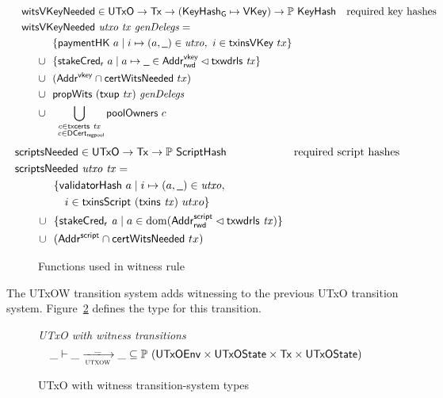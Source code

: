 \begin{figure}[htb]
  \begin{align*}
    & \hspace{-0.8cm}\fun{witsVKeyNeeded} \in \UTxO \to \Tx \to (\KeyHashGen\mapsto\VKey) \to
      \powerset{\KeyHash}
    & \text{required key hashes} \\
    &  \hspace{-0.8cm}\fun{witsVKeyNeeded}~\var{utxo}~\var{tx}~\var{genDelegs} = \\
    & ~~\{ \fun{paymentHK}~a \mid i \mapsto (a, \wcard) \in \var{utxo},~i\in\fun{txinsVKey}~{tx} \} \\
    \cup & ~~
           \{\fun{stakeCred_r}~a\mid a\mapsto \wcard \in \AddrRWDVKey
      \restrictdom \txwdrls{tx}\}\\
    \cup & ~~(\AddrVKey \cap \fun{certWitsNeeded}~{tx}) \\
    \cup & ~~\fun{propWits}~(\fun{txup}~\var{tx})~\var{genDelegs} \\
    \cup & ~~\bigcup_{\substack{c \in \txcerts{tx} \\ ~c \in\DCertRegPool}} \fun{poolOwners}~{c}
  \end{align*}
  \begin{align*}
    & \hspace{-1cm}\fun{scriptsNeeded} \in \UTxO \to \Tx \to
      \powerset{\HashScr}
    & \text{required script hashes} \\
    &  \hspace{-1cm}\fun{scriptsNeeded}~\var{utxo}~\var{tx} = \\
    & ~~\{ \fun{validatorHash}~a \mid i \mapsto (a, \wcard) \in \var{utxo},\\
    & ~~~~~i\in\fun{txinsScript}~{(\fun{txins~\var{tx}})}~{utxo}\} \\
    \cup & ~~\{ \fun{stakeCred_{r}}~\var{a} \mid a \in \dom (\AddrRWDScr
           \restrictdom \fun{txwdrls}~\var{tx}) \} \\
      \cup & ~~(\AddrScr \cap \fun{certWitsNeeded}~{tx})
  \end{align*}
  \caption{Functions used in witness rule}
  \label{fig:functions-witnesses}
\end{figure}

The UTxOW transition system adds witnessing to the previous UTxO transition system.
Figure~\ref{fig:ts-types:utxow-sophie} defines the type for this transition.

\begin{figure}
  \emph{UTxO with witness transitions}
  \begin{equation*}
    \var{\_} \vdash
    \var{\_} \trans{utxow}{\_} \var{\_}
    \subseteq \powerset (\UTxOEnv \times \UTxOState \times \Tx \times \UTxOState)
  \end{equation*}
  \caption{UTxO with witness transition-system types}
  \label{fig:ts-types:utxow-sophie}
\end{figure}

